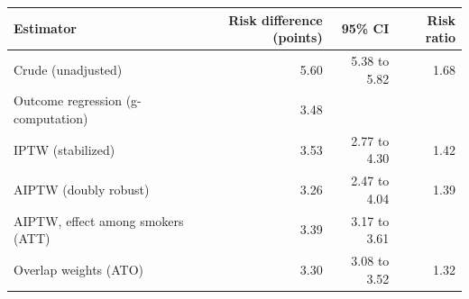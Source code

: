 {\small
\begin{tabular}{lrrr}
\toprule
Estimator & Risk difference (points) & 95\% CI & Risk ratio \\
\midrule
Crude (unadjusted) & 5.60 & 5.38 to 5.82 & 1.68 \\
Outcome regression (g-computation) & 3.48 &  &  \\
IPTW (stabilized) & 3.53 & 2.77 to 4.30 & 1.42 \\
AIPTW (doubly robust) & 3.26 & 2.47 to 4.04 & 1.39 \\
AIPTW, effect among smokers (ATT) & 3.39 & 3.17 to 3.61 &  \\
Overlap weights (ATO) & 3.30 & 3.08 to 3.52 & 1.32 \\
\bottomrule
\end{tabular}
}
